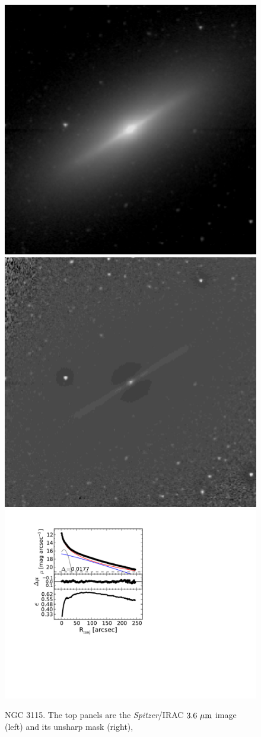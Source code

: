\documentclass[useAMS,usenatbib,article]{mnras}
\begin{document}
\begin{figure}
\begin{center}
\includegraphics[width=0.49\columnwidth]{n3115_image.jpeg}
\includegraphics[width=0.49\columnwidth]{n3115_unsharp.jpeg} \\
\includegraphics[width=1.05\columnwidth]{n3115_decomposition.pdf}
\caption{NGC 3115. 
The top panels are the \emph{Spitzer}/IRAC $3.6~\rm \mu m$ image (left) and its unsharp mask (right), 
}
\end{center}
\end{figure}
\end{document}
